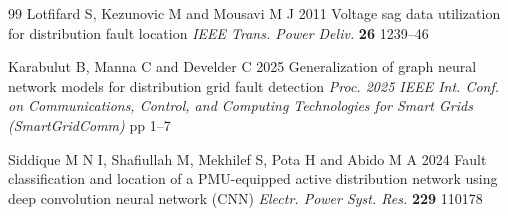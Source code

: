 \documentclass[11pt]{article}
\begin{document}
\begin{thebibliography}{99}
 Lotfifard S, Kezunovic M and Mousavi M J 2011 Voltage sag data utilization for distribution fault location \textit{IEEE Trans. Power Deliv.} \textbf{26} 1239--46

 Karabulut B, Manna C and Develder C 2025 Generalization of graph neural network models for distribution grid fault detection \textit{Proc. 2025 IEEE Int. Conf. on Communications, Control, and Computing Technologies for Smart Grids (SmartGridComm)} pp 1--7

 Siddique M N I, Shafiullah M, Mekhilef S, Pota H and Abido M A 2024 Fault classification and location of a PMU-equipped active distribution network using deep convolution neural network (CNN) \textit{Electr. Power Syst. Res.} \textbf{229} 110178

\end{thebibliography}
\end{document}
